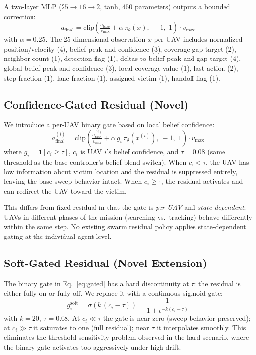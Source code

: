\documentclass[conference]{IEEEtran}
\begin{document}
A two-layer MLP ($25 \to 16 \to 2$, tanh, 450 parameters) outputs a bounded correction:
\begin{equation}
  a_{\text{final}} = \mathrm{clip}\!\left(
    \tfrac{a_{\text{base}}}{v_{\max}} + \alpha\,\pi_\theta(x),\; -1,\; 1
  \right) \cdot v_{\max}
  \label{eq:fixed}
\end{equation}
with $\alpha = 0.25$. The 25-dimensional observation $x$ per UAV includes normalized
position/velocity (4), belief peak and confidence (3), coverage gap target (2),
neighbor count (1), detection flag (1), deltas to belief peak and gap target (4),
global belief peak and confidence (3), local coverage value (1), last action (2),
step fraction (1), lane fraction (1), assigned victim (1), handoff flag (1).

\subsection{Confidence-Gated Residual (Novel)}

We introduce a per-UAV binary gate based on local belief confidence:
\begin{equation}
  a_{\text{final}}^{(i)} = \mathrm{clip}\!\left(
    \tfrac{a_{\text{base}}^{(i)}}{v_{\max}} + \alpha\,g_i\,\pi_\theta(x^{(i)}),\; -1,\; 1
  \right) \cdot v_{\max}
  \label{eq:gated}
\end{equation}
where $g_i = \mathbf{1}[c_i \geq \tau]$, $c_i$ is UAV $i$'s belief confidence, and
$\tau = 0.08$ (same threshold as the base controller's belief-blend switch). When
$c_i < \tau$, the UAV has low information about victim location and the residual is
suppressed entirely, leaving the base sweep behavior intact. When $c_i \geq \tau$,
the residual activates and can redirect the UAV toward the victim.

This differs from fixed residual in that the gate is \emph{per-UAV} and
\emph{state-dependent}: UAVs in different phases of the mission (searching vs.\ tracking)
behave differently within the same step. No existing swarm residual policy applies
state-dependent gating at the individual agent level.

\subsection{Soft-Gated Residual (Novel Extension)}

The binary gate in Eq.~\eqref{eq:gated} has a hard discontinuity at $\tau$: the
residual is either fully on or fully off. We replace it with a continuous sigmoid gate:
\begin{equation}
  g_i^{\text{soft}} = \sigma\!\left(k\,(c_i - \tau)\right) = \frac{1}{1+e^{-k(c_i-\tau)}}
  \label{eq:soft}
\end{equation}
with $k{=}20$, $\tau{=}0.08$. At $c_i \ll \tau$ the gate is near zero (sweep behavior
preserved); at $c_i \gg \tau$ it saturates to one (full residual); near $\tau$ it
interpolates smoothly. This eliminates the threshold-sensitivity problem observed in
the hard scenario, where the binary gate activates too aggressively under high drift.
\end{document}
